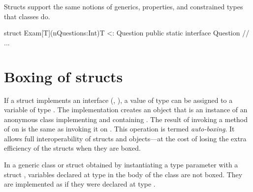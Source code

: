 Structs support the same notions of generics, properties, and constrained
types that classes do.  

\begin{ex}

\begin{xten}
struct Exam[T](nQuestions:Int){T <: Question} {
  public static interface Question {}
  // ... 
}
\end{xten}
%


\end{ex}


\section{Boxing of structs}
\label{auto-boxing} 
If a struct  implements an interface  (\eg, ),
a value  of type  can be assigned to a variable of type
. The implementation creates an object  that is an
instance of an anonymous class implementing  and containing
.  The result of invoking a method of  on  is the
same as invoking it on . This operation is termed {\em auto-boxing}.
It allows full interoperability of structs and objects---at the cost of losing
the extra efficiency of the structs when they are boxed.

In a generic class or struct obtained by instantiating a type parameter
 with a struct , variables declared at type  in the body
of the class are not boxed. They are implemented as if they were declared at
type .

